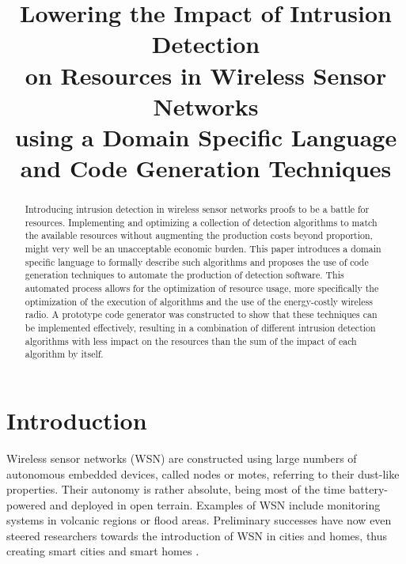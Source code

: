 \documentclass[conference]{IEEEtran}
\begin{document}
\expandafter\def\csname PY@tok@err\endcsname{}

\title{Lowering the Impact of Intrusion Detection\\
on Resources in Wireless Sensor Networks\\
using a Domain Specific Language\\
and Code Generation Techniques}

\author{%
}

\maketitle

\begin{abstract}
  
Introducing intrusion detection in wireless sensor networks proofs to be a
battle for resources. Implementing and optimizing a collection of detection
algorithms to match the available resources without augmenting the production
costs beyond proportion, might very well be an unacceptable economic burden.
This paper introduces a domain specific language to formally describe such
algorithms and proposes the use of code generation techniques to automate the
production of detection software. This automated process allows for the
optimization of resource usage, more specifically the optimization of the
execution of algorithms and the use of the energy-costly wireless radio. A
prototype code generator was constructed to show that these techniques can be
implemented effectively, resulting in a combination of different intrusion
detection algorithms with less impact on the resources than the sum of the
impact of each algorithm by itself.

\end{abstract}

\section{Introduction}

Wireless sensor networks (WSN) are constructed using large numbers of
autonomous embedded devices, called nodes or motes, referring to their
dust-like properties. Their autonomy is rather absolute, being most of the time
battery-powered and deployed in open terrain. Examples of WSN include
monitoring systems in volcanic regions or flood areas. Preliminary successes
have now even steered researchers towards the introduction of WSN in cities and
homes, thus creating smart cities \cite{schaffers2011smart} and smart homes
\cite{chan2008review}.
\end{document}
